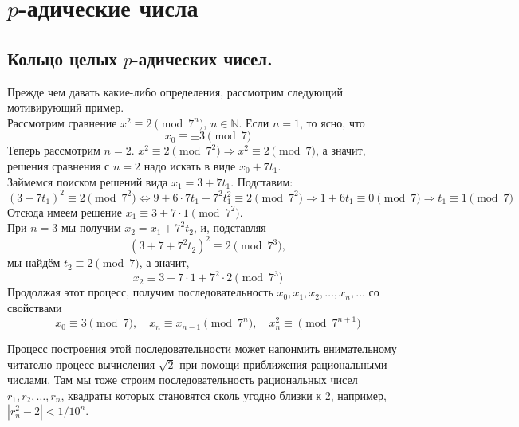 \documentclass[11pt]{article}
\begin{document}
   \section{$p$-адические числа}
   \subsection{Кольцо целых $p$-адических чисел.}

    Прежде чем давать какие-либо определения, рассмотрим следующий мотивирующий пример. \\
    Рассмотрим сравнение $x^2 \equiv 2 \pmod{7^n}$, $n \in \mathbb{N}$. Если $n = 1$, то ясно, что
    \[ x_0 \equiv \pm 3 \pmod{7} \]
    Теперь рассмотрим $n = 2$. $x^2 \equiv 2 \pmod{7^2} \Rightarrow x^2 \equiv 2
    \pmod{7}$, а значит, решения сравнения с $n = 2$ надо искать в виде $x_0 + 7t_1$.\\
    Займемся поиском решений вида $x_1 = 3 + 7t_1$. Подставим:
    \[ (3 + 7t_1)^2 \equiv 2 \pmod{7^2} \Leftrightarrow 9 + 6 \cdot 7t_1 + 7^2 t_1^2 \equiv 2 \pmod{7^2} \Rightarrow 1 + 6t_1 \equiv 0 \pmod{7} \Rightarrow t_1 \equiv 1 \pmod 7 \]
    Отсюда имеем решение  $x_1 \equiv 3 + 7 \cdot 1 \pmod{7^2}$.\\
    При $n = 3$ мы получим $x_2 = x_1 + 7^2 t_2$, и, подставляя
    \[ (3 + 7 + 7^2 t_2)^2 \equiv 2 \pmod{7^3}, \]
    мы найдём $t_2 \equiv 2 \pmod{7}$, а значит,
    \[ x_2 \equiv 3 + 7 \cdot 1 + 7^2 \cdot 2 \pmod{7^3} \]
    Продолжая этот процесс, получим последовательность $x_0, x_1, x_2, \ldots, x_n, \ldots$ со свойствами
    \[ x_0 \equiv 3 \pmod{7}, \quad x_n \equiv x_{n - 1} \pmod{7^n}, \quad x_n^2 \equiv \pmod{7^{n + 1}} \]

    Процесс построения этой последовательности может напонмить внимательному читателю процесс вычисления $\sqrt{2}$
    при помощи приближения рациональными числами. Там мы тоже строим последовательность рациональных чисел
    $r_1, r_2, \ldots, r_n$, квадраты которых становятся сколь угодно близки к 2, например, $|r_n^2 - 2|< 1/10^n$.
\end{document}
